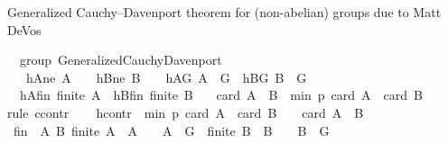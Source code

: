 \begin{isabellebody}
{}
\isamarkuptrue%
%
\endisatagdocument
{\isafolddocument}%
%
\isadelimdocument
%
\endisadelimdocument
%
\begin{isamarkuptext}%
Generalized Cauchy--Davenport theorem for (non-abelian) groups due to Matt DeVos \cite{DeVos2016OnAG}%
\end{isamarkuptext}\isamarkuptrue%
\isamarkupfalse%
\ {\isacharparenleft}{\kern0pt}\ group{\isacharparenright}{\kern0pt}\ Generalized{\isacharunderscore}{\kern0pt}Cauchy{\isacharunderscore}{\kern0pt}Davenport{\isacharcolon}{\kern0pt}\isanewline
\ \ \ hAne{\isacharcolon}{\kern0pt}\ {\isachardoublequoteopen}A\ {\isasymnoteq}\ {\isacharbraceleft}{\kern0pt}{\isacharbraceright}{\kern0pt}{\isachardoublequoteclose}\ \ hBne{\isacharcolon}{\kern0pt}\ {\isachardoublequoteopen}B\ {\isasymnoteq}\ {\isacharbraceleft}{\kern0pt}{\isacharbraceright}{\kern0pt}{\isachardoublequoteclose}\ \ hAG{\isacharcolon}{\kern0pt}\ {\isachardoublequoteopen}A\ {\isasymsubseteq}\ G{\isachardoublequoteclose}\ \ hBG{\isacharcolon}{\kern0pt}\ {\isachardoublequoteopen}B\ {\isasymsubseteq}\ G{\isachardoublequoteclose}\ \isanewline
\ \ hAfin{\isacharcolon}{\kern0pt}\ {\isachardoublequoteopen}finite\ A{\isachardoublequoteclose}\ \ hBfin{\isacharcolon}{\kern0pt}\ {\isachardoublequoteopen}finite\ B{\isachardoublequoteclose}\isanewline
\ \ \ {\isachardoublequoteopen}card\ {\isacharparenleft}{\kern0pt}A\ {\isasymcdots}\ B{\isacharparenright}{\kern0pt}\ {\isasymge}\ min\ p\ {\isacharparenleft}{\kern0pt}card\ A\ {\isacharplus}{\kern0pt}\ card\ B\ {\isacharminus}{\kern0pt}\ {}{\isacharparenright}{\kern0pt}{\isachardoublequoteclose}\isanewline
%
\isadelimproof
%
\endisadelimproof
%
\isatagproof
{}\isamarkupfalse%
{\isacharparenleft}{\kern0pt}rule\ ccontr{\isacharparenright}{\kern0pt}\isanewline
\ \ \isamarkupfalse%
\ hcontr{\isacharcolon}{\kern0pt}\ {\isachardoublequoteopen}{\isasymnot}\ min\ p\ {\isacharparenleft}{\kern0pt}card\ A\ {\isacharplus}{\kern0pt}\ card\ B\ {\isacharminus}{\kern0pt}\ {}{\isacharparenright}{\kern0pt}\ {\isasymle}\ card\ {\isacharparenleft}{\kern0pt}A\ {\isasymcdots}\ B{\isacharparenright}{\kern0pt}{\isachardoublequoteclose}\isanewline
\ \ \isamarkupfalse%
\ {\isacharquery}{\kern0pt}fin\ {\isacharequal}{\kern0pt}\ {\isachardoublequoteopen}{\isacharbraceleft}{\kern0pt}{\isacharparenleft}{\kern0pt}A{\isacharcomma}{\kern0pt}\ B{\isacharparenright}{\kern0pt}{\isachardot}{\kern0pt}\ finite\ A\ {\isasymand}\ A\ {\isasymnoteq}\ {\isacharbraceleft}{\kern0pt}{\isacharbraceright}{\kern0pt}\ {\isasymand}\ A\ {\isasymsubseteq}\ G\ {\isasymand}\ finite\ B\ {\isasymand}\ B\ {\isasymnoteq}\ {\isacharbraceleft}{\kern0pt}{\isacharbraceright}{\kern0pt}\ {\isasymand}\ B\ {\isasymsubseteq}\ G{\isacharbraceright}{\kern0pt}{\isachardoublequoteclose}\isanewline

\end{isabellebody}
